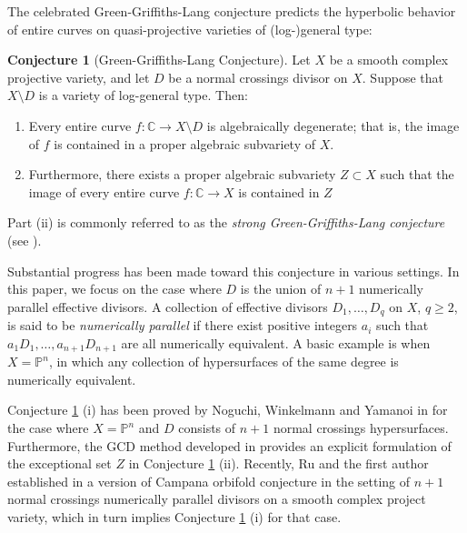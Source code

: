 \documentclass[10pt]{amsart}
\numberwithin{equation}{section}
\theoremstyle{plain}
\theoremstyle{definition}
\newtheorem{conjecture}[theorem]{Conjecture}
\begin{document}
The celebrated Green-Griffiths-Lang conjecture predicts the hyperbolic behavior of entire curves on quasi-projective varieties of (log-)general type:
\begin{conjecture}[Green-Griffiths-Lang Conjecture]\label{GGL}
Let $X$ be a smooth complex projective variety, and let $D$ be a normal crossings divisor on $X$.   Suppose that $X\setminus D$ is a variety of log-general type.   Then:   
\begin{enumerate}
\item
Every entire curve $f : \mathbb{C} \to X\setminus D$ is algebraically degenerate; that is, the image of $f$ is contained in a proper algebraic subvariety of $X$.
\item Furthermore, there exists a proper algebraic subvariety $Z \subset X$ such that the image of every entire curve $f : \mathbb{C} \to X$ is contained in $Z$
\end{enumerate}
\end{conjecture}
Part (ii) is commonly referred to as the \emph{strong Green-Griffiths-Lang conjecture} (see \cite[Conjecture 6.6.30]{NW}).
 
Substantial progress has been made toward this conjecture in various settings. In this paper, we focus on the case where $D$ is the union of  $n+1$ numerically parallel effective divisors. A collection of  effective divisors  $D_1,\hdots,D_q$ on  $X$, $q\ge 2$,  
is said to be {\it numerically parallel} if there exist positive integers $a_i$ such that $a_1D_1, \ldots, a_{n+1}D_{n+1}$ are all numerically equivalent.  A basic example is when $X=\mathbb P^n$, in which any collection of hypersurfaces of the same degree is numerically equivalent. 

 
 Conjecture \ref{GGL} (i) has been  proved by Noguchi, Winkelmann and Yamanoi  in \cite{NWY07} for the case where $X=\mathbb P^n$ and $D$ consists of $n+1$ normal crossings hypersurfaces.  Furthermore, the GCD method developed in  \cite{GNSW} provides an explicit formulation of the exceptional set $Z$ in Conjecture \ref{GGL} (ii).  Recently, Ru and the first author established 
in \cite{RW24}  a version of Campana orbifold conjecture in the setting of  $n+1$ normal crossings numerically parallel divisors on a smooth complex project variety, which in turn implies Conjecture \ref{GGL} (i) for that case.
\end{document}
